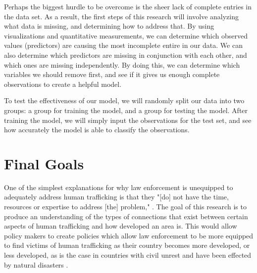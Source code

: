 \documentclass{article} %
\begin{document}
Perhaps the biggest hurdle to be overcome is the sheer lack of complete entries in the data set. As a result, the first steps of this research will involve analyzing what data is missing, and determining how to address that. By using visualizations and quantitative measurements, we can determine which observed values (predictors) are causing the most incomplete entire in our data. We can also determine which predictors are missing in conjunction with each other, and which ones are missing independently. By doing this, we can determine which variables we should remove first, and see if it gives us enough complete observations to create a helpful model.

To test the effectiveness of our model, we will randomly split our data into two groups: a group for training the model, and a group for testing the model. After training the model, we will simply input the observations for the test set, and see how accurately the model is able to classify the observations.

\section{Final Goals}

One of the simplest explanations for why law enforcement is unequipped to adequately address human trafficking is that they "[do] not have the time,
resources or expertise to address [the] problem," \parencite{LawResponse}. The goal of this research is to produce an understanding of the types of connections that exist between certain aspects of human trafficking and how developed an area is. This would allow policy makers to create policies which allow law enforcement to be more equipped to find victims of human trafficking as their country becomes more developed, or less developed, as is the case in countries with civil unrest and have been effected by natural disasters \parencite{bar2010}.


\printbibliography
\end{document}
